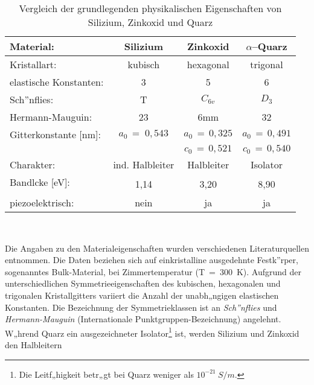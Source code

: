 \begin{table}[htb]
\caption{\label{tabsiznoquarz}
 Vergleich der grundlegenden physikalischen Eigenschaften von Silizium,
 Zinkoxid und Quarz}
\begin{center}
\begin{tabular}{|l||c|c|c|} \hline
{\bf Material:} & Silizium & Zinkoxid  & $ \alpha $--Quarz \\  \hline \hline
Kristallart: & kubisch  & hexagonal        & trigonal          \\ \hline
elastische Konstanten:                             & 3 & 5 & 6 \\ \hline
Sch”nflies:           & T  & $ C_{6v} $ & $ D_{3} $      \\ \hline
Hermann-Mauguin:      & 23 & 6mm             &  32            \\ \hline
Gitterkonstante [nm]: & $ a_{0} \, = \; 0,543 $ &
                        $ a_{0} \, = \, 0,325 $ &
                        $ a_{0} \, = \, 0,491 $                \\
                      &                          &
                        $ c_{0} \, = \, 0,521 $  &
                        $ c_{0} \, = \, 0,540 $                \\ \hline
Charakter:        & ind. Halbleiter &  Halbleiter & Isolator   \\ \hline
Bandlcke [eV]:   & 1,14            &  3,20       & 8,90       \\ \hline
piezoelektrisch:  & nein            &  ja         & ja         \\ \hline
\end{tabular}\\
\end{center}
\end{table}
Die Angaben zu den
Materialeigenschaften wurden verschiedenen Literaturquellen \cite{Kit88,
LB82, Tic80} entnommen. Die Daten beziehen sich auf einkristalline
ausgedehnte Festk”rper, sogenanntes Bulk-Material, bei
Zimmertemperatur (T~=~300~K). Aufgrund der unterschiedlichen
Symmetrieeigenschaften des kubischen, hexagonalen und trigonalen
Kristallgitters variiert die Anzahl der unabh„ngigen elastischen
Konstanten. Die Bezeichnung der Symmetrieklassen ist an {\sl Sch”nflies}
und {\sl Hermann-Mauguin} (Internationale Punktgruppen-Bezeichnung)
angelehnt. W„hrend Quarz ein ausgezeichneter
Isolator\footnote{Die Leitf„higkeit betr„gt bei Quarz weniger als
$10^{-21} \: S/m$.} ist, werden Silizium und Zinkoxid den Halbleitern
